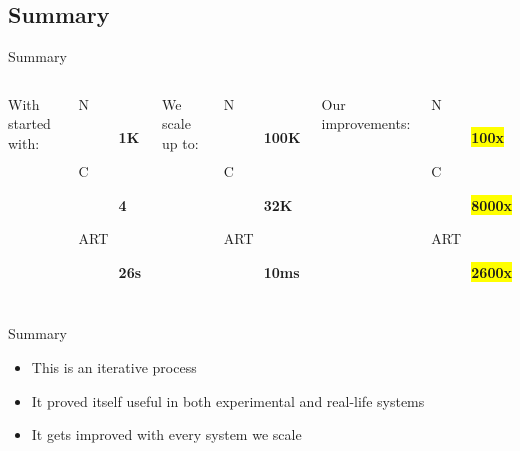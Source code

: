 \documentclass[utf8,hyperref={colorlinks=true}]{beamer}
\begin{document}
\subsection{Summary}
\begin{frame}{Summary}
	\begin{columns}
			With started with:
			\begin{description}
				\item[N] \textbf{\Large 1K}
				\item[C] \textbf{\Large 4}
				\item[ART] \textbf{\Large 26s}
			\end{description}
			We scale up to:
			\begin{description}
				\item[N] \textbf{\Large 100K}
				\item[C] \textbf{\Large 32K}
				\item[ART] \textbf{\Large 10ms}
			\end{description}
			Our improvements:
			\begin{description}
				\item[N] \textbf{\colorbox{yellow}{100x}}
				\item[C] \textbf{\colorbox{yellow}{8000x}}
				\item[ART] \textbf{\colorbox{yellow}{2600x}}
			\end{description}
	\end{columns}
\end{frame}
\begin{frame}{Summary}
	\begin{itemize}
		\item<+-> This is an \alert{iterative} process
		\item<+-> It proved itself useful in both experimental and real-life systems
		\item<+-> It gets improved with every system we scale
	\end{itemize}
\end{frame}
\end{document}
